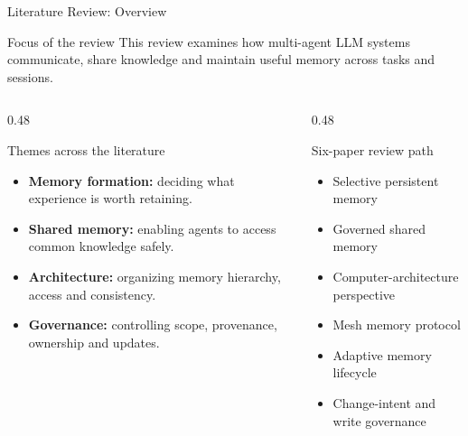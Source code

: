 \begin{frame}{Literature Review: Overview}
\begin{block}{Focus of the review}
This review examines how multi-agent LLM systems communicate, share knowledge and maintain useful memory across tasks and sessions.
\end{block}
\begin{columns}[T,onlytextwidth]
\begin{column}{0.48\textwidth}
\begin{block}{Themes across the literature}
\begin{itemize}
\item \textbf{Memory formation:} deciding what experience is worth retaining.
\item \textbf{Shared memory:} enabling agents to access common knowledge safely.
\item \textbf{Architecture:} organizing memory hierarchy, access and consistency.
\item \textbf{Governance:} controlling scope, provenance, ownership and updates.
\end{itemize}
\end{block}
\end{column}
\begin{column}{0.48\textwidth}
\begin{block}{Six-paper review path}
\begin{itemize}
\item Selective persistent memory
\item Governed shared memory
\item Computer-architecture perspective
\item Mesh memory protocol
\item Adaptive memory lifecycle
\item Change-intent and write governance
\end{itemize}
\end{block}
\end{column}
\end{columns}
\end{frame}
